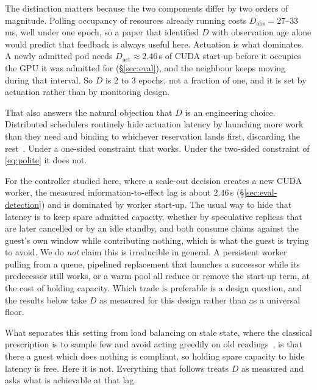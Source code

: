 The distinction matters because the two components differ by two orders of
magnitude. Polling occupancy of resources already running costs
$D_{\mathrm{obs}}=27$--$33$\,ms, well under one epoch, so a paper that identified
$D$ with observation age alone would predict that feedback is always useful here.
Actuation is what dominates. A newly admitted pod needs
$D_{\mathrm{act}}\approx2.46$\,s of CUDA start-up before it occupies the GPU it was
admitted for (\S\ref{sec:eval}), and the neighbour keeps moving during that
interval. So $D$ is $2$ to $3$ epochs, not a fraction of one, and it is set by
actuation rather than by monitoring design.

That also answers the natural objection that $D$ is an engineering choice.
Distributed schedulers routinely hide actuation latency by launching more work
than they need and binding to whichever reservation lands first, discarding the
rest~\cite{sparrow}. Under a one-sided constraint that works. Under the two-sided
constraint of \eqref{eq:polite} it does not.

\begin{remark}
\label{prop:irreducible}
For the controller studied here, where a scale-out decision creates a new CUDA
worker, the measured information-to-effect lag is about $2.46$\,s
(\S\ref{sec:eval-detection}) and is dominated by worker start-up. The usual way to
hide that latency is to keep spare admitted capacity, whether by speculative
replicas that are later cancelled or by an idle standby, and both consume claims
against the guest's own window while contributing nothing, which is what the
guest is trying to avoid. We do \emph{not} claim this is irreducible in general.
A persistent worker pulling from a queue, pipelined replacement that launches a
successor while its predecessor still works, or a warm pool all reduce or remove
the start-up term, at the cost of holding capacity. Which trade is preferable is a
design question, and the results below take $D$ as measured for this design rather
than as a universal floor.
\end{remark}
What separates this setting from load balancing on stale state, where the classical
prescription is to sample few and avoid acting greedily on old
readings~\cite{mitzenmacher,goel}, is that there a guest which does nothing is
compliant, so holding spare capacity to hide latency is free. Here it is not.
Everything that follows treats $D$ as measured and asks what is achievable at that
lag.

